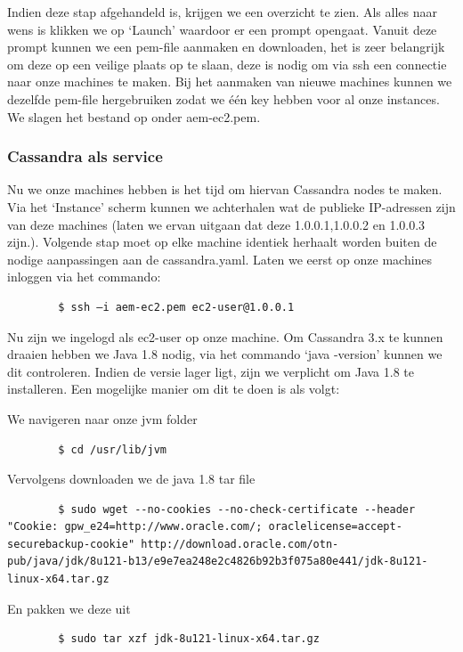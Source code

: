 \documentclass{article}
\begin{document}
	\par
	Indien deze stap afgehandeld is, krijgen we een overzicht te zien. 
	Als alles naar wens is klikken we op ‘Launch’ waardoor er een prompt opengaat. 
	Vanuit deze prompt kunnen we een pem-file aanmaken en downloaden, het is zeer belangrijk om 
	deze op een veilige plaats op te slaan, deze is nodig om via ssh een connectie naar onze machines te maken. 
	Bij het aanmaken van nieuwe machines kunnen we dezelfde pem-file hergebruiken zodat we \'e\'en key hebben voor al onze instances.
	 We slagen het bestand op onder aem-ec2.pem.
	
	\subsubsection{Cassandra als service}
	Nu we onze machines hebben is het tijd om hiervan Cassandra nodes te maken. 
	Via het ‘Instance’ scherm kunnen we achterhalen wat de publieke IP-adressen zijn van deze machines 
	(laten we ervan uitgaan dat deze 1.0.0.1,1.0.0.2 en 1.0.0.3 zijn.). 
	Volgende stap moet op elke machine identiek herhaalt worden buiten de nodige aanpassingen aan de cassandra.yaml. 
	Laten we eerst op onze machines inloggen via het commando:
	
	\begin{lstlisting}
		$ ssh –i aem-ec2.pem ec2-user@1.0.0.1 
	\end{lstlisting}
	
	Nu zijn we ingelogd als ec2-user op onze machine. Om Cassandra 3.x te kunnen draaien hebben we Java 1.8 nodig, 
	via het commando ‘java -version’ kunnen we dit controleren. 
	Indien de versie lager ligt, zijn we verplicht om Java 1.8 te installeren. Een mogelijke manier om dit te doen is als volgt:	
	\par
	We navigeren naar onze jvm folder
	\begin{lstlisting}
  		$ cd /usr/lib/jvm
	\end{lstlisting}
	\par
	Vervolgens downloaden we de java 1.8 tar file
	\begin{lstlisting}
		$ sudo wget --no-cookies --no-check-certificate --header "Cookie: gpw_e24=http://www.oracle.com/; oraclelicense=accept-securebackup-cookie" http://download.oracle.com/otn-pub/java/jdk/8u121-b13/e9e7ea248e2c4826b92b3f075a80e441/jdk-8u121-linux-x64.tar.gz
	\end{lstlisting}
	
	\par
	En pakken we deze uit
	\begin{lstlisting}
		$ sudo tar xzf jdk-8u121-linux-x64.tar.gz
	\end{lstlisting}
	
\end{document}
